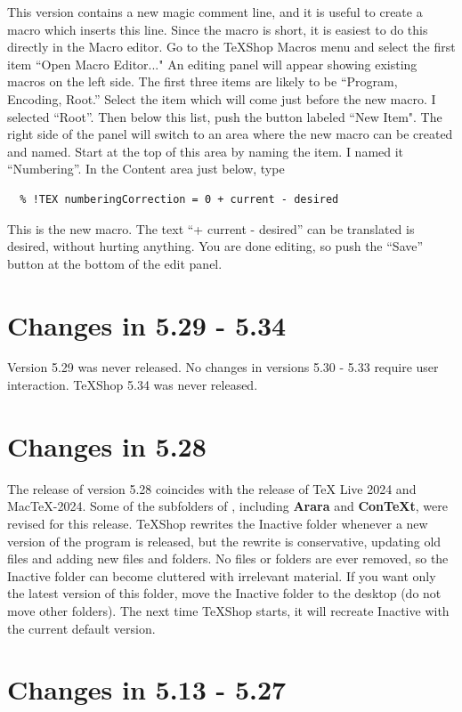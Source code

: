 \documentclass[11pt, oneside]{amsart}
\begin{document}
This version contains a new magic comment line, and it is useful to create a macro which inserts this line. Since the macro is short, it is easiest to do this directly in the Macro editor. Go to the TeXShop Macros menu and select the first item ``Open Macro Editor..." An editing panel will appear showing existing macros on the left side. The first three items are likely to be ``Program, Encoding, Root.'' Select the item which will come just before the new macro. I selected ``Root''. Then below this list, push the button labeled ``New Item". The right side of the panel will switch to an area where the new macro can be created and named. Start at the top of this area by naming the item.
I named it ``Numbering''. In the Content area just below, type
\begin{verbatim}
  % !TEX numberingCorrection = 0 + current - desired
\end{verbatim}
This is the new macro. The text ``+ current - desired'' can be translated is desired, without hurting anything.
You are done editing, so push the ``Save'' button at the bottom of the edit panel.


\section{Changes in 5.29 - 5.34}

Version 5.29 was never released. No changes in versions 5.30 - 5.33 require user interaction. TeXShop 5.34 was never released.


\section{Changes in 5.28}

The release of version 5.28 coincides with the release of TeX Live 2024 and MacTeX-2024. Some of the subfolders of 
, including {\bf Arara} and {\bf ConTeXt}, were revised for this release.
TeXShop rewrites the Inactive folder whenever a new version of the program is released, but the rewrite is  conservative, updating old files and adding new files and folders. No files or folders are ever removed, so the Inactive folder can become cluttered with  irrelevant material. If you want only the latest version of this folder, move the Inactive folder to the desktop (do not move other folders). The next time TeXShop starts, it will recreate Inactive with the current default version.

\section{Changes in 5.13 - 5.27}
\end{document}

